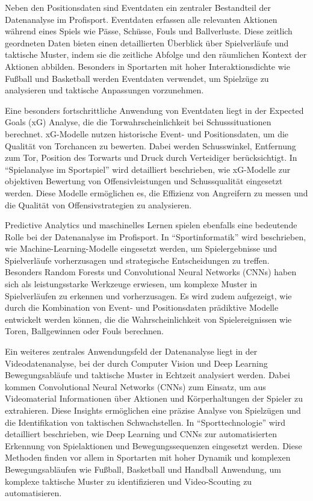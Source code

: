 \documentclass[
  number]{elsarticle}
\begin{document}
Neben den Positionsdaten sind Eventdaten ein zentraler Bestandteil der
Datenanalyse im Profisport. Eventdaten erfassen alle relevanten Aktionen
während eines Spiels wie Pässe, Schüsse, Fouls und Ballverluste. Diese
zeitlich geordneten Daten bieten einen detaillierten Überblick über
Spielverläufe und taktische Muster, indem sie die zeitliche Abfolge und
den räumlichen Kontext der Aktionen abbilden. Besonders in Sportarten
mit hoher Interaktionsdichte wie Fußball und Basketball werden
Eventdaten verwendet, um Spielzüge zu analysieren und taktische
Anpassungen vorzunehmen. \citep[pp.~174-180]{memmert_spielanalyse}

Eine besonders fortschrittliche Anwendung von Eventdaten liegt in der
Expected Goals (xG) Analyse, die die Torwahrscheinlichkeit bei
Schusssituationen berechnet. xG-Modelle nutzen historische Event- und
Positionsdaten, um die Qualität von Torchancen zu bewerten. Dabei werden
Schusswinkel, Entfernung zum Tor, Position des Torwarts und Druck durch
Verteidiger berücksichtigt. In ``Spielanalyse im Sportspiel'' wird
detailliert beschrieben, wie xG-Modelle zur objektiven Bewertung von
Offensivleistungen und Schussqualität eingesetzt werden. Diese Modelle
ermöglichen es, die Effizienz von Angreifern zu messen und die Qualität
von Offensivstrategien zu analysieren. \citep[pp.~40-41,
208-209]{memmert_sportinformatik}

Predictive Analytics und maschinelles Lernen spielen ebenfalls eine
bedeutende Rolle bei der Datenanalyse im Profisport. In
``Sportinformatik'' wird beschrieben, wie Machine-Learning-Modelle
eingesetzt werden, um Spielergebnisse und Spielverläufe vorherzusagen
und strategische Entscheidungen zu treffen. Besonders Random Forests und
Convolutional Neural Networks (CNNs) haben sich als leistungsstarke
Werkzeuge erwiesen, um komplexe Muster in Spielverläufen zu erkennen und
vorherzusagen. Es wird zudem aufgezeigt, wie durch die Kombination von
Event- und Positionsdaten prädiktive Modelle entwickelt werden können,
die die Wahrscheinlichkeit von Spielereignissen wie Toren, Ballgewinnen
oder Fouls berechnen. \citep[pp.~74-79]{memmert_sportinformatik}

Ein weiteres zentrales Anwendungsfeld der Datenanalyse liegt in der
Videodatenanalyse, bei der durch Computer Vision und Deep Learning
Bewegungsabläufe und taktische Muster in Echtzeit analysiert werden.
Dabei kommen Convolutional Neural Networks (CNNs) zum Einsatz, um aus
Videomaterial Informationen über Aktionen und Körperhaltungen der
Spieler zu extrahieren. Diese Insights ermöglichen eine präzise Analyse
von Spielzügen und die Identifikation von taktischen Schwachstellen. In
``Sporttechnologie'' wird detailliert beschrieben, wie Deep Learning und
CNNs zur automatisierten Erkennung von Spielaktionen und
Bewegungssequenzen eingesetzt werden. Diese Methoden finden vor allem in
Sportarten mit hoher Dynamik und komplexen Bewegungsabläufen wie
Fußball, Basketball und Handball Anwendung, um komplexe taktische Muster
zu identifizieren und Video-Scouting zu automatisieren.
\citep[pp.~32-37]{memmert_sportinformatik}
\end{document}
